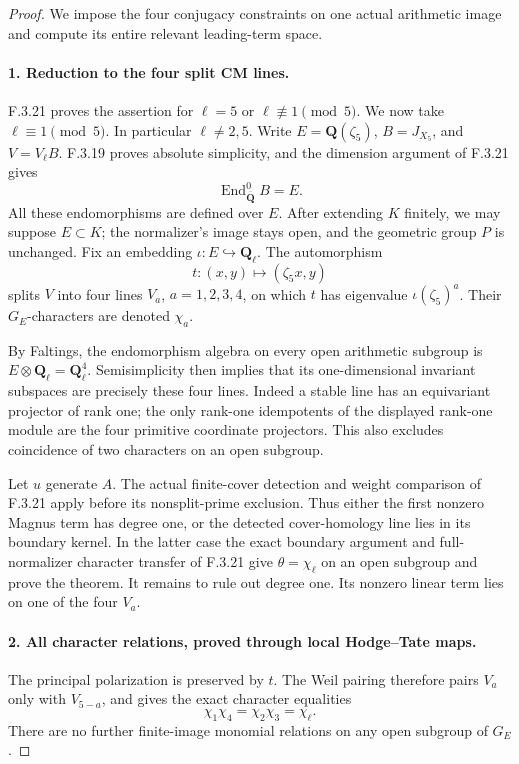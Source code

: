 \begin{proof}
We impose the four conjugacy constraints on one actual arithmetic image and compute its entire relevant leading-term space.

\paragraph{1. Reduction to the four split CM lines.}

F.3.21 proves the assertion for $\ell=5$ or
$\ell\not\equiv1\pmod5$. We now take $\ell\equiv1\pmod5$.
In particular $\ell\ne2,5$. Write $E=\mathbf Q(\zeta_5)$,
$B=J_{X_5}$, and $V=V_\ell B$. F.3.19 proves absolute
simplicity, and the dimension argument of F.3.21 gives
\[
 \operatorname{End}^0_{\overline{\mathbf Q}}B=E.
\]
All these endomorphisms are defined over $E$. After extending
$K$ finitely, we may suppose $E\subset K$; the normalizer's
image stays open, and the geometric group $P$ is unchanged.
Fix an embedding $\iota:E\hookrightarrow\mathbf Q_\ell$.
The automorphism
\[
 t:(x,y)\longmapsto(\zeta_5x,y)
\]
splits $V$ into four lines $V_a$, $a=1,2,3,4$, on which $t$
has eigenvalue $\iota(\zeta_5)^a$. Their $G_E$-characters are
denoted $\chi_a$.

By Faltings\cite[\S5, S\"atze~3--4, p.~360]{GenFaltings1983}, the endomorphism algebra on every open arithmetic
subgroup is $E\otimes\mathbf Q_\ell=\mathbf Q_\ell^4$.
Semisimplicity then implies that its one-dimensional invariant
subspaces are precisely these four lines. Indeed a stable
line has an equivariant projector of rank one; the only
rank-one idempotents of the displayed rank-one module are
the four primitive coordinate projectors. This also excludes
coincidence of two characters on an open subgroup.

Let $u$ generate $A$. The actual finite-cover detection and
weight comparison of F.3.21 apply before its nonsplit-prime
exclusion. Thus either the first nonzero Magnus term has
degree one, or the detected cover-homology line lies in its
boundary kernel. In the latter case the exact boundary
argument and full-normalizer character transfer of F.3.21
give $\theta=\chi_\ell$ on an open subgroup and prove the
theorem. It remains to rule out degree one. Its nonzero
linear term lies on one of the four $V_a$.

\paragraph{2. All character relations, proved through local Hodge--Tate maps.}
The principal polarization is preserved by $t$. The Weil
pairing therefore pairs $V_a$ only with $V_{5-a}$, and gives
the exact character equalities
\[
 \chi_1\chi_4=\chi_2\chi_3=\chi_\ell.
 \tag{X5.1}
\]
There are no further finite-image monomial relations on any
open subgroup of $G_E$.


\end{proof}
